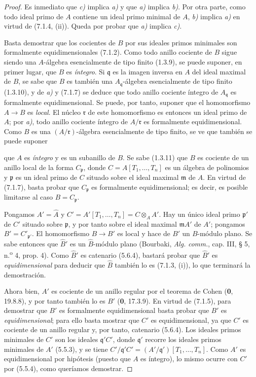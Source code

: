\begin{proof}
Es inmediato que \emph{c)} implica \emph{a)} y que \emph{a)} implica \emph{b)}.
Por otra parte, como todo ideal primo de $A$ contiene
un ideal primo minimal de $A$, \emph{b)} implica \emph{a)} en virtud
de (7.1.4, (ii)). Queda por probar que \emph{a)} implica \emph{c)}.

Basta demostrar que los cocientes de $B$ por sus ideales
primos minimales son formalmente equidimensionales
(7.1.2). Como todo anillo cociente de $B$ sigue siendo
una $A$-álgebra esencialmente de tipo finito (1.3.9),
se puede suponer, en primer lugar, que $B$ es
\emph{íntegro}. Si $\mathfrak q$ es la imagen inversa
en $A$ del ideal maximal de $B$, se sabe que $B$ es
también una $A_{\mathfrak q}$-álgebra esencialmente
de tipo finito (1.3.10), y de \emph{a)} y (7.1.7) se deduce
que todo anillo cociente íntegro de $A_{\mathfrak q}$
es formalmente equidimensional. Se puede, por tanto,
suponer que el homomorfismo $A\to B$ es \emph{local}.
El núcleo $\mathfrak r$ de este homomorfismo es
entonces un ideal primo de $A$; por \emph{a)}, todo anillo
cociente íntegro de $A/\mathfrak r$ es formalmente
equidimensional. Como $B$ es una
$(A/\mathfrak r)$-álgebra esencialmente de tipo
finito, se ve que también se puede suponer

que $A$ es \emph{íntegro} y es un subanillo de $B$.
Se sabe (1.3.11) que $B$ es cociente de un anillo
local de la forma $C_{\mathfrak p}$, donde
$C=A[T_1,\ldots,T_n]$ es un álgebra de polinomios
y $\mathfrak p$ es un ideal primo de $C$ situado
sobre el ideal maximal $\mathfrak m$ de $A$.
En virtud de (7.1.7), basta probar que
$C_{\mathfrak p}$ es formalmente equidimensional;
es decir, es posible limitarse al caso
$B=C_{\mathfrak p}$.

Pongamos $A'=\widehat A$ y
$C'=A'[T_1,\ldots,T_n]=C\otimes_AA'$.
Hay un único ideal primo $\mathfrak p'$ de $C'$
situado sobre $\mathfrak p$, y por tanto sobre el
ideal maximal $\mathfrak mA'$ de $A'$; pongamos
$B'=C'_{\mathfrak p'}$. El homomorfismo
$B\to B'$ es local y hace de $B'$ un $B$-módulo
plano. Se sabe entonces que $\widehat{B}'$ es
un $\widehat B$-módulo plano (Bourbaki,
\emph{Alg. comm.}, cap. III, § 5,
n.\textsuperscript{o} 4, prop. 4).
Como $\widehat{B}'$ es catenario (5.6.4),
bastará probar que $\widehat{B}'$ es
\emph{equidimensional} para deducir que
$\widehat B$ también lo es (7.1.3, (i)),
lo que terminará la demostración.

Ahora bien, $A'$ es cociente de un anillo regular
por el teorema de Cohen (\textbf{0}, 19.8.8), y por tanto
también lo es $B'$ (\textbf 0, 17.3.9). En virtud de
(7.1.5), para demostrar que $B'$ es formalmente
equidimensional basta probar que $B'$ es
\emph{equidimensional}; para ello basta mostrar que
$C'$ es equidimensional, ya que $C'$ es cociente
de un anillo regular y, por tanto, catenario
(5.6.4). Los ideales primos minimales de $C'$
son los ideales $\mathfrak q'C'$, donde
$\mathfrak q'$ recorre los ideales primos minimales
de $A'$ (5.5.3), y se tiene
$C'/\mathfrak q'C'=(A'/\mathfrak q')[T_1,\ldots,T_n]$.
Como $A'$ es equidimensional por hipótesis
(puesto que $A$ es íntegro), lo mismo ocurre
con $C'$ por (5.5.4), como queríamos demostrar.
\end{proof}
